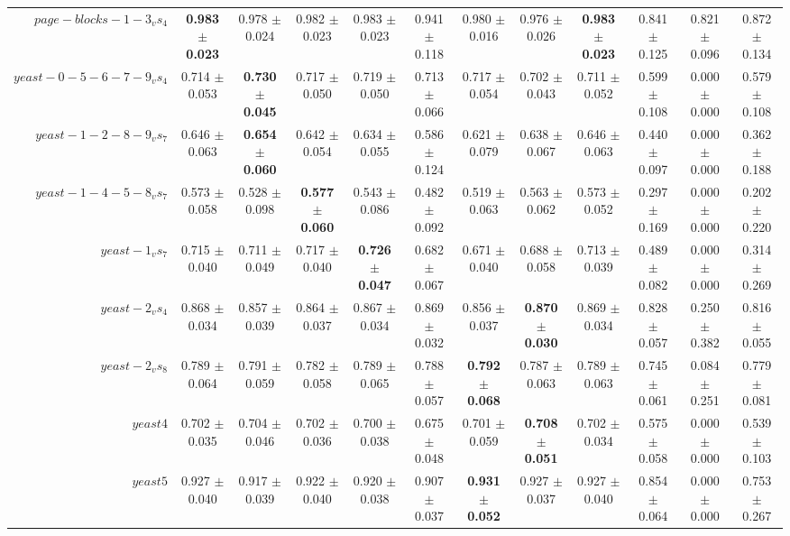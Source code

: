 \begin{table}[!ht]
{\begin{tabular}{r c c c c c c c c c c c}
$page-blocks-1-3_vs_4$ & \textbf{0.983 $\pm$ 0.023} & 0.978 $\pm$ 0.024 & 0.982 $\pm$ 0.023 & 0.983 $\pm$ 0.023 & 0.941 $\pm$ 0.118 & 0.980 $\pm$ 0.016 & 0.976 $\pm$ 0.026 & \textbf{0.983 $\pm$ 0.023} & 0.841 $\pm$ 0.125 & 0.821 $\pm$ 0.096 & 0.872 $\pm$ 0.134 \\
$yeast-0-5-6-7-9_vs_4$ & 0.714 $\pm$ 0.053 & \textbf{0.730 $\pm$ 0.045} & 0.717 $\pm$ 0.050 & 0.719 $\pm$ 0.050 & 0.713 $\pm$ 0.066 & 0.717 $\pm$ 0.054 & 0.702 $\pm$ 0.043 & 0.711 $\pm$ 0.052 & 0.599 $\pm$ 0.108 & 0.000 $\pm$ 0.000 & 0.579 $\pm$ 0.108 \\
$yeast-1-2-8-9_vs_7$ & 0.646 $\pm$ 0.063 & \textbf{0.654 $\pm$ 0.060} & 0.642 $\pm$ 0.054 & 0.634 $\pm$ 0.055 & 0.586 $\pm$ 0.124 & 0.621 $\pm$ 0.079 & 0.638 $\pm$ 0.067 & 0.646 $\pm$ 0.063 & 0.440 $\pm$ 0.097 & 0.000 $\pm$ 0.000 & 0.362 $\pm$ 0.188 \\
$yeast-1-4-5-8_vs_7$ & 0.573 $\pm$ 0.058 & 0.528 $\pm$ 0.098 & \textbf{0.577 $\pm$ 0.060} & 0.543 $\pm$ 0.086 & 0.482 $\pm$ 0.092 & 0.519 $\pm$ 0.063 & 0.563 $\pm$ 0.062 & 0.573 $\pm$ 0.052 & 0.297 $\pm$ 0.169 & 0.000 $\pm$ 0.000 & 0.202 $\pm$ 0.220 \\
$yeast-1_vs_7$ & 0.715 $\pm$ 0.040 & 0.711 $\pm$ 0.049 & 0.717 $\pm$ 0.040 & \textbf{0.726 $\pm$ 0.047} & 0.682 $\pm$ 0.067 & 0.671 $\pm$ 0.040 & 0.688 $\pm$ 0.058 & 0.713 $\pm$ 0.039 & 0.489 $\pm$ 0.082 & 0.000 $\pm$ 0.000 & 0.314 $\pm$ 0.269 \\
$yeast-2_vs_4$ & 0.868 $\pm$ 0.034 & 0.857 $\pm$ 0.039 & 0.864 $\pm$ 0.037 & 0.867 $\pm$ 0.034 & 0.869 $\pm$ 0.032 & 0.856 $\pm$ 0.037 & \textbf{0.870 $\pm$ 0.030} & 0.869 $\pm$ 0.034 & 0.828 $\pm$ 0.057 & 0.250 $\pm$ 0.382 & 0.816 $\pm$ 0.055 \\
$yeast-2_vs_8$ & 0.789 $\pm$ 0.064 & 0.791 $\pm$ 0.059 & 0.782 $\pm$ 0.058 & 0.789 $\pm$ 0.065 & 0.788 $\pm$ 0.057 & \textbf{0.792 $\pm$ 0.068} & 0.787 $\pm$ 0.063 & 0.789 $\pm$ 0.063 & 0.745 $\pm$ 0.061 & 0.084 $\pm$ 0.251 & 0.779 $\pm$ 0.081 \\
$yeast4$ & 0.702 $\pm$ 0.035 & 0.704 $\pm$ 0.046 & 0.702 $\pm$ 0.036 & 0.700 $\pm$ 0.038 & 0.675 $\pm$ 0.048 & 0.701 $\pm$ 0.059 & \textbf{0.708 $\pm$ 0.051} & 0.702 $\pm$ 0.034 & 0.575 $\pm$ 0.058 & 0.000 $\pm$ 0.000 & 0.539 $\pm$ 0.103 \\
$yeast5$ & 0.927 $\pm$ 0.040 & 0.917 $\pm$ 0.039 & 0.922 $\pm$ 0.040 & 0.920 $\pm$ 0.038 & 0.907 $\pm$ 0.037 & \textbf{0.931 $\pm$ 0.052} & 0.927 $\pm$ 0.037 & 0.927 $\pm$ 0.040 & 0.854 $\pm$ 0.064 & 0.000 $\pm$ 0.000 & 0.753 $\pm$ 0.267 \\

\end{tabular}}
\end{table}
